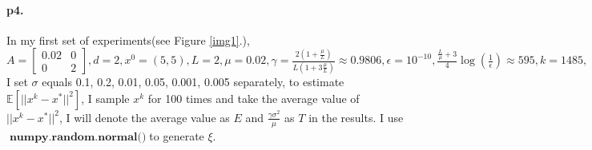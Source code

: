 \documentclass[12pt,a4paper]{article}
\DeclareMathOperator{\xyz}{\textbf{numpy.random.normal()}}
\begin{document}
\paragraph{p4.}
In my first set of experiments(see Figure \ref{img1}.), $A = \left [
\begin{array}{cc}
	0.02 & 0 \\
	0 & 2
\end{array}
\right ], d = 2, x^0 = (5,5), L = 2, \mu = 0.02, \gamma = \frac{2(1+\frac{\mu}{L})}{L(1+3\frac{\mu}{L})}\approx 0.9806, \epsilon = 10^{-10}, \frac{\frac{L}{\mu}+3}{4}\log(\frac{1}{\epsilon})\approx 595, k=1485, $  I set  $\sigma$ equals 0.1, 0.2, 0.01, 0.05, 0.001, 0.005 separately, to estimate $\mathbb{E}\left[||x^k-x^*||^2\right]$, I sample $x^k$ for 100 times and take the average value of $||x^k-x^*||^2$, I will denote the average value as $E$ and $\frac{\gamma\sigma^2}{\mu}$ as $T$ in the results. I use $\xyz$to generate $\xi.$
\end{document}
